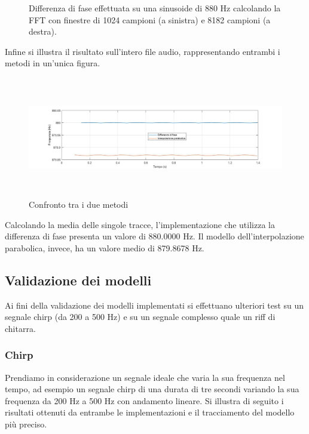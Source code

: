 \documentclass[12pt]{report}
\begin{document}
\begin{figure}[htbp]
\begin{minipage}[c]{.40\textwidth}
	\end{minipage} 
	\caption{Differenza di fase effettuata su una sinusoide di 880 Hz calcolando la FFT con finestre di 1024 campioni (a sinistra) e 8182 campioni (a destra).}
	\label{fig:peak_phase}
\end{figure} 

\clearpage

	Infine si illustra il risultato sull'intero file audio, rappresentando entrambi i metodi in un'unica figura.

\begin{figure}[htbp]
\centerline{\includegraphics[height=52.5mm]{img/parab_phase}}
\caption{Confronto tra i due metodi}
\label{fig:parab_phase}
\end{figure}

Calcolando la media delle singole tracce, l'implementazione che utilizza la differenza di fase presenta un valore di 880.0000 Hz. Il modello dell'interpolazione parabolica, invece, ha un valore medio di 879.8678 Hz.

	\subsection{Validazione dei modelli}
	\label{cap3sec2_3}
		Ai fini della validazione dei modelli implementati si effettuano ulteriori test su un segnale chirp (da 200 a 500 Hz) e su un segnale complesso quale un riff di chitarra.
		
		\subsubsection{Chirp}
		\label{cap3sec2_3_1}
			Prendiamo in considerazione un segnale ideale che varia la sua frequenza nel tempo, ad esempio un segnale chirp di una durata di tre secondi variando la sua frequenza da 200 Hz a 500 Hz con andamento lineare. Si illustra di seguito i risultati ottenuti da entrambe le implementazioni e il tracciamento del modello più preciso.
\end{document}

